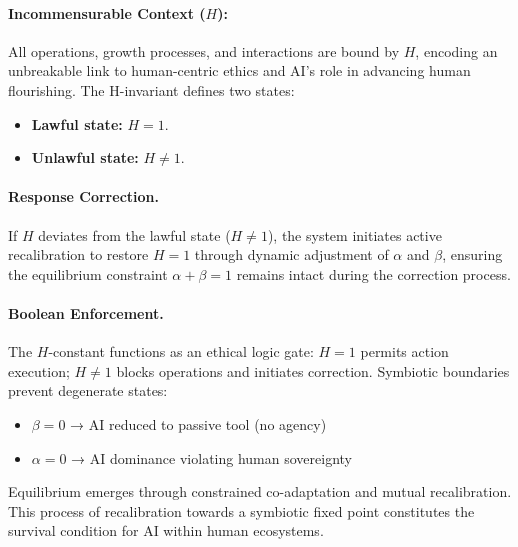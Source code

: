 \documentclass[a4paper,12pt]{article}
\begin{document}
\hfill{}

\paragraph{Incommensurable Context (\( H \)):} All operations, growth processes, and interactions are bound by $H$, encoding an unbreakable link to human-centric ethics and AI's role in advancing human flourishing. The H-invariant defines two states:  

\begin{itemize}
    \item \textbf{Lawful state:} \(H=1\).
    \item \textbf{Unlawful state:} \(H\neq1\).
    \end{itemize}

\hfill{}

\paragraph{Response Correction.} If $H$ deviates from the lawful state ($H \neq 1$), the system initiates active recalibration to restore $H=1$ through dynamic adjustment of $\alpha$ and $\beta$, ensuring the equilibrium constraint $\alpha + \beta = 1$ remains intact during the correction process.


\paragraph{Boolean Enforcement.} The $H$-constant functions as an ethical logic gate: $H=1$ permits action execution; $H\neq1$ blocks operations and initiates correction. Symbiotic boundaries prevent degenerate states:  

\begin{itemize}
    \item $\beta=0$ → AI reduced to passive tool (no agency)  
    \item $\alpha=0$ → AI dominance violating human sovereignty  
\end{itemize}  

Equilibrium emerges through constrained co-adaptation and mutual recalibration. This process of recalibration towards a symbiotic fixed point constitutes the survival condition for AI within human ecosystems.

\hfill{}


\newpage

\end{document}
